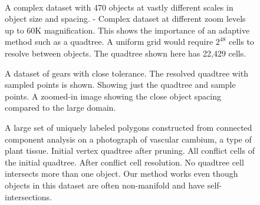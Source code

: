 \documentclass[final,3p,times,twocolumn]{elsarticle}
\begin{document}
\begin{figure}
  \centering
   \\
  \caption{
    \protect{} A complex dataset with 470 objects at vastly different scales in object size and spacing.
    \protect{}-\protect{} Complex dataset at different zoom levels up to 60K magnification. This shows the importance of an adaptive method such as a quadtree. A uniform grid would require $2^{48}$ cells to resolve between objects. The quadtree shown here has 22,429 cells.
  }
  \label{fig:results-maze}
\end{figure}


\begin{figure}
  \centering
  \caption{
    \protect{} A dataset of gears with close tolerance. The resolved quadtree with sampled points is shown.
    \protect{} Showing just the quadtree and sample points.
    \protect{} A zoomed-in image showing the close object spacing compared to the large domain.
  }
  \label{fig:gears}
\end{figure}

\begin{figure}
  \centering
  \subfloat[][]{
    \label{fig:vascular-3}
    \texttt{[image: Nathan/vascular-bundles/14-Resolved-Quadtree.PNG]} }
  \caption{A large set of uniquely labeled polygons constructed from connected component analysis on a photograph of vascular cambium, a type of plant tissue.
    \protect{} Initial vertex quadtree after pruning.
    \protect{} All conflict cells of the initial quadtree.
    \protect{} After conflict cell resolution. No quadtree cell intersects more than one object. Our method works even though objects in this dataset are often non-manifold and have self-intersections.
  }
  \label{fig:vascular}
\end{figure}
\end{document}
